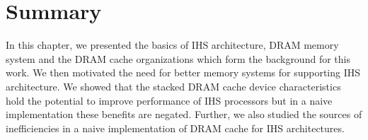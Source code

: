 \section{Summary}
In this chapter, we presented the basics of IHS architecture, DRAM memory system and the DRAM cache organizations which form the background for this work. We then motivated the need for better memory systems for supporting IHS architecture. We showed that the stacked DRAM cache device characteristics hold the potential to improve performance of IHS processors but in a naive implementation these benefits are negated. Further, we also studied the sources of inefficiencies in a naive implementation of DRAM cache for IHS architectures.
